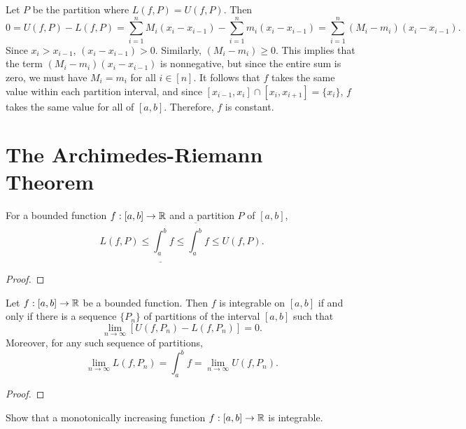 \documentclass[letterpaper, twoside, 12pt]{book}
\begin{document}
\begin{solution}
    Let \(P\) be the partition where \(L(f, P) = U(f, P)\). Then
    \[ 0 = U(f, P) - L(f, P) = \sum_{i=1}^{n} M_i(x_{i} - x_{i-1}) -
                                \sum_{i = 1}^{n} m_i (x_{i} - x_{i-1}) 
                            = \sum_{i=1}^{n} (M_{i} - m_{i})(x_{i} - x_{i-1}) .\]
    Since \(x_{i} > x_{i-1}\), \((x_{i} - x_{i-1}) > 0\).  Similarly,
    \((M_{i} - m_{i}) \geq 0\). This implies that the term 
    \((M_{i} - m_{i})(x_{i} - x_{i-1})\) is nonnegative, but since 
    the entire sum is zero, we must have \(M_{i} = m_{i}\) for
    all \(i \in [n]\). It follows that \(f\) takes the same value
    within each partition interval, and since 
    \([x_{i - 1}, x_{i}] \cap [x_{i}, x_{i + 1}] = \{x_{i}\}\), \(f\)
    takes the same value for all of \([a,b]\). Therefore, \(f\)
    is constant.
\end{solution}




\section{The Archimedes-Riemann Theorem}


\begin{lemma}[6.7]
  For a bounded function \(f:[a,b]\to\mathbb R\) and a partition \(P\) of
  \([a,b]\),
  \[
    L(f,P)
      \leq
    \underline{\int_a^b}f\leq\overline{\int_a^b}f\leq U(f,P)
  .\]
\end{lemma}
\begin{proof}

\end{proof}


\begin{theorem}
  Let \(f:[a,b]\to\mathbb R\) be a bounded function. Then \(f\) is integrable on
  \([a,b]\) if and only if there is a sequence \(\{P_n\}\) of partitions
  of the interval \([a,b]\) such that
  \[
    \lim_{n\to\infty}[U(f,P_n)-L(f,P_n)]=0
  .\]
  Moreover, for any such sequence of partitions,
  \[
    \lim_{n\to\infty} L(f,P_n)
      =
    \int_a^b f
      =
    \lim_{n\to\infty} U(f,P_n)
  .\]
\end{theorem}
\begin{proof}

\end{proof}


\begin{example}[6.9]
  Show that
  a monotonically increasing function \(f:[a,b]\to\mathbb R\) is integrable.
\end{example}
\begin{solution}

\end{solution}
\end{document}
